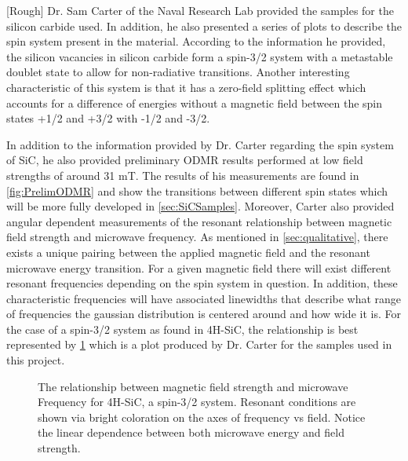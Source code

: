 \documentclass[oneside, astronomy, noacknowlegments]{BYUPhys}
\begin{document}
[Rough] Dr. Sam Carter of the Naval Research Lab provided the samples for the silicon carbide used. In addition, he also presented a series of plots to describe the spin system present in the material. According to the information he provided, the silicon vacancies in silicon carbide form a spin-3/2 system with a metastable doublet state to allow for non-radiative transitions. Another interesting characteristic of this system is that it has a zero-field splitting effect which accounts for a difference of energies without a magnetic field between the spin states +1/2 and +3/2 with -1/2 and -3/2.

In addition to the information provided by Dr. Carter regarding the spin system of SiC, he also provided preliminary ODMR results performed at low field strengths of around 31 mT. The results of his measurements are found in \ref{fig:PrelimODMR} and show the transitions between different spin states which will be more fully developed in \ref{sec:SiCSamples}. Moreover, Carter also provided angular dependent measurements of the resonant relationship between magnetic field strength and microwave frequency. As mentioned in \ref{sec:qualitative}, there exists a unique pairing between the applied magnetic field and the resonant microwave energy transition. For a given magnetic field there will exist different resonant frequencies depending on the spin system in question. In addition, these characteristic frequencies will have associated linewidths that describe what range of frequencies the gaussian distribution is centered around and how wide it is. For the case of a spin-3/2 system as found in 4H-SiC, the relationship is best represented by \ref{fig:MFRelationship} which is a plot produced by Dr. Carter for the samples used in this project.

\begin{figure}
    \caption[Magnetic field and microwave frequency relationship]{\label{fig:MFRelationship}
     The relationship between magnetic field strength and microwave Frequency for 4H-SiC, a spin-3/2 system. Resonant conditions are shown via bright coloration on the axes of frequency vs field. Notice the linear dependence between both microwave energy and field strength.}
 \end{figure}
 
\end{document}
